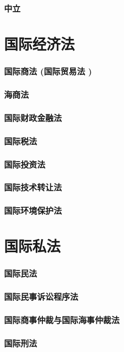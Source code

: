 \documentclass[UTF8]{../ApplicationUniverse}
\begin{document}
    \subsubsection{中立}
    
\section{国际经济法}
    \subsubsection{国际商法 (国际贸易法 )}
    \subsubsection{海商法}
    \subsubsection{国际财政金融法}
    \subsubsection{国际税法}
    \subsubsection{国际投资法}
    \subsubsection{国际技术转让法}
    \subsubsection{国际环境保护法}

\section{国际私法}
    \subsubsection{国际民法}
    \subsubsection{国际民事诉讼程序法}
    \subsubsection{国际商事仲裁与国际海事仲裁法}
    \subsubsection{国际刑法}
\end{document}
